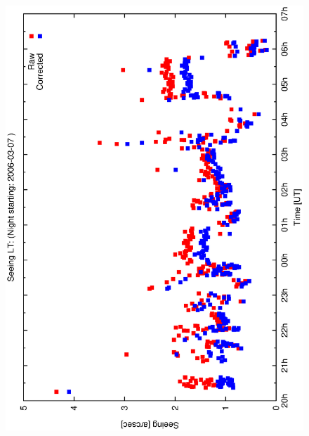 {{\begin{figure}[htbp]
\begin{center}
{    \includegraphics[scale=0.25, angle=-90]{figures/ecs/see_profile_2006_03_07.eps} 
    \label{fig:see_profile_2006_03_07}
  }
\end{center}
\end{figure}}}
